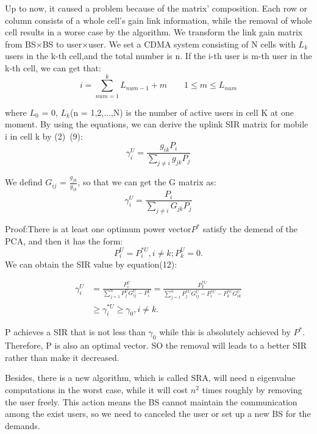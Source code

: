 \documentclass[conference]{IEEEtran}
\begin{document}
\vspace*{3mm}
Up to now, it caused a problem because of the matrix' composition. Each row or column consists of a whole cell's gain link information, while the removal of whole cell results in a worse case by the algorithm. We transform the link gain matrix from BS$\times $BS to user$\times$user. We set a CDMA system consisting of N cells with $L_k$ users in the k-th cell,and the total number is n. If the i-th user is m-th user in the k-th cell, we can get that:
\begin{equation}
i=\sum^k_{num=1}L_{num-1}+m \qquad 1\leq m\leq L_{num}
\end{equation}  

where $L_0$ = 0, $L_k$(n = 1,2,...,N) is the number of active users in cell K at one moment. By using the equations, we can derive the uplink SIR matrix for mobile i in cell k by (2)~(9):
\begin{equation}
\gamma_i^U = \frac{g_{ik}P_i}{ \sum_{j\neq i}g_{jk}P_j}
\end{equation}

We defind $G_{ij}$ = $\frac{g_{jk}}{g_{ik}}$, so that we can get the G matrix as:
\begin{equation}
\gamma_i^U = \frac{P_i}{ \sum_{j\neq i}G_{jk}P_j}
\end{equation}

Proof:There is at least one optimum power vector$ P^*$ satisfy the demend of the PCA, and then it has the form:
\begin{equation*}
P_i^{U} = P_i^{*U}, i \neq k; P_k^U=0.
\end{equation*}
We can obtain the SIR value by equation(12):

\begin{align*}
\gamma_i^U &= \frac{P_i^U}{\sum_{j=1}^{n}P_j^UG^U_{ij}-P^U_i} =\frac{P_I^{*U}}{\sum_{j=1}^{n}P_j^{*U}G^U_{ij}-P^{*U}_i-P^{*U}_kG^U_{ik}}	\\
&\geq \gamma_i^{*U}\geq \gamma_0, i \neq k.
\end{align*}	

P achieves a SIR that is not less than $\gamma_0$ while this is absolutely  achieved by $P^*$. Therefore, P is also an optimal vector. SO the removal will leads to a better SIR rather than make it decreased. 

Besides, there is a new algorithm, which is called SRA, will need n eigenvalue computations in the worst case, while it will cost $n^2$ times roughly by removing the user freely. This action means the BS cannot maintain the communication among the exist users, so we need to canceled the user or set up a new BS for the demands.
\end{document}
